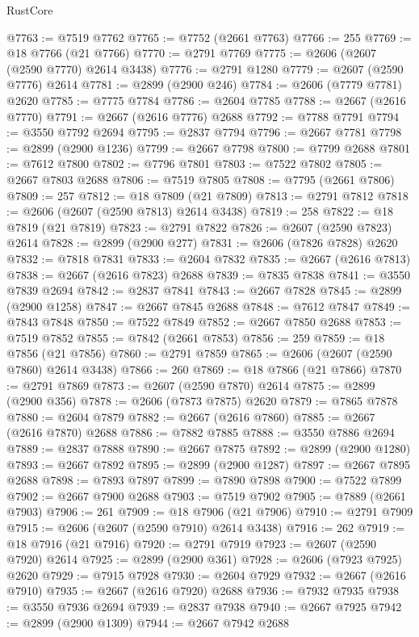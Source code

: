 \begin{lexlean}{RustCore}
\begin{coremodule}
@7763 := @7519 @7762
@7765 := @7752 (@2661 @7763)
@7766 := 255
@7769 := @18 @7766 (@21 @7766)
@7770 := @2791 @7769
@7775 := @2606 (@2607 (@2590 @7770) @2614 @3438)
@7776 := @2791 @1280
@7779 := @2607 (@2590 @7776) @2614
@7781 := @2899 (@2900 @246)
@7784 := @2606 (@7779 @7781) @2620
@7785 := @7775 @7784
@7786 := @2604 @7785
@7788 := @2667 (@2616 @7770)
@7791 := @2667 (@2616 @7776) @2688
@7792 := @7788 @7791
@7794 := @3550 @7792 @2694
@7795 := @2837 @7794
@7796 := @2667 @7781
@7798 := @2899 (@2900 @1236)
@7799 := @2667 @7798
@7800 := @7799 @2688
@7801 := @7612 @7800
@7802 := @7796 @7801
@7803 := @7522 @7802
@7805 := @2667 @7803 @2688
@7806 := @7519 @7805
@7808 := @7795 (@2661 @7806)
@7809 := 257
@7812 := @18 @7809 (@21 @7809)
@7813 := @2791 @7812
@7818 := @2606 (@2607 (@2590 @7813) @2614 @3438)
@7819 := 258
@7822 := @18 @7819 (@21 @7819)
@7823 := @2791 @7822
@7826 := @2607 (@2590 @7823) @2614
@7828 := @2899 (@2900 @277)
@7831 := @2606 (@7826 @7828) @2620
@7832 := @7818 @7831
@7833 := @2604 @7832
@7835 := @2667 (@2616 @7813)
@7838 := @2667 (@2616 @7823) @2688
@7839 := @7835 @7838
@7841 := @3550 @7839 @2694
@7842 := @2837 @7841
@7843 := @2667 @7828
@7845 := @2899 (@2900 @1258)
@7847 := @2667 @7845 @2688
@7848 := @7612 @7847
@7849 := @7843 @7848
@7850 := @7522 @7849
@7852 := @2667 @7850 @2688
@7853 := @7519 @7852
@7855 := @7842 (@2661 @7853)
@7856 := 259
@7859 := @18 @7856 (@21 @7856)
@7860 := @2791 @7859
@7865 := @2606 (@2607 (@2590 @7860) @2614 @3438)
@7866 := 260
@7869 := @18 @7866 (@21 @7866)
@7870 := @2791 @7869
@7873 := @2607 (@2590 @7870) @2614
@7875 := @2899 (@2900 @356)
@7878 := @2606 (@7873 @7875) @2620
@7879 := @7865 @7878
@7880 := @2604 @7879
@7882 := @2667 (@2616 @7860)
@7885 := @2667 (@2616 @7870) @2688
@7886 := @7882 @7885
@7888 := @3550 @7886 @2694
@7889 := @2837 @7888
@7890 := @2667 @7875
@7892 := @2899 (@2900 @1280)
@7893 := @2667 @7892
@7895 := @2899 (@2900 @1287)
@7897 := @2667 @7895 @2688
@7898 := @7893 @7897
@7899 := @7890 @7898
@7900 := @7522 @7899
@7902 := @2667 @7900 @2688
@7903 := @7519 @7902
@7905 := @7889 (@2661 @7903)
@7906 := 261
@7909 := @18 @7906 (@21 @7906)
@7910 := @2791 @7909
@7915 := @2606 (@2607 (@2590 @7910) @2614 @3438)
@7916 := 262
@7919 := @18 @7916 (@21 @7916)
@7920 := @2791 @7919
@7923 := @2607 (@2590 @7920) @2614
@7925 := @2899 (@2900 @361)
@7928 := @2606 (@7923 @7925) @2620
@7929 := @7915 @7928
@7930 := @2604 @7929
@7932 := @2667 (@2616 @7910)
@7935 := @2667 (@2616 @7920) @2688
@7936 := @7932 @7935
@7938 := @3550 @7936 @2694
@7939 := @2837 @7938
@7940 := @2667 @7925
@7942 := @2899 (@2900 @1309)
@7944 := @2667 @7942 @2688

\end{coremodule}
\end{lexlean}
